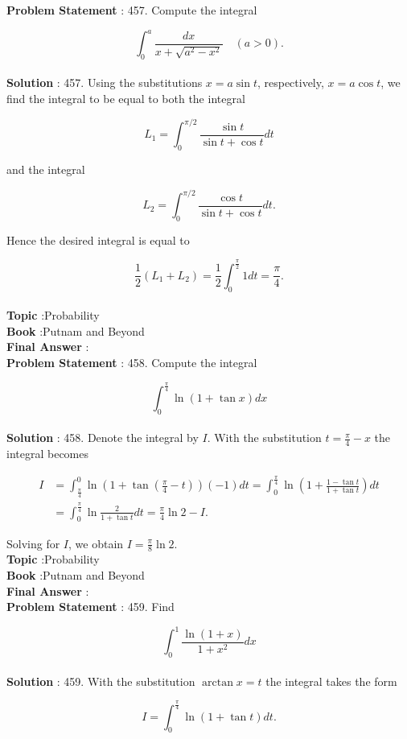 \documentclass[10pt]{article}
\begin{document}
\textbf{Problem Statement} :
457. Compute the integral

$$
\int_{0}^{a} \frac{d x}{x+\sqrt{a^{2}-x^{2}}} \quad(a>0) .
$$
\\
\textbf{Solution} :
457. Using the substitutions $x=a \sin t$, respectively, $x=a \cos t$, we find the integral to be equal to both the integral

$$
L_{1}=\int_{0}^{\pi / 2} \frac{\sin t}{\sin t+\cos t} d t
$$

and the integral

$$
L_{2}=\int_{0}^{\pi / 2} \frac{\cos t}{\sin t+\cos t} d t .
$$

Hence the desired integral is equal to

$$
\frac{1}{2}\left(L_{1}+L_{2}\right)=\frac{1}{2} \int_{0}^{\frac{\pi}{2}} 1 d t=\frac{\pi}{4} .
$$
\\
\textbf{Topic} :Probability\\
\textbf{Book} :Putnam and Beyond\\
\textbf{Final Answer} :\\


\textbf{Problem Statement} :
458. Compute the integral

$$
\int_{0}^{\frac{\pi}{4}} \ln (1+\tan x) d x
$$
\\
\textbf{Solution} :
458. Denote the integral by $I$. With the substitution $t=\frac{\pi}{4}-x$ the integral becomes

$$
\begin{aligned}
I &=\int_{\frac{\pi}{4}}^{0} \ln \left(1+\tan \left(\frac{\pi}{4}-t\right)\right)(-1) d t=\int_{0}^{\frac{\pi}{4}} \ln \left(1+\frac{1-\tan t}{1+\tan t}\right) d t \\
&=\int_{0}^{\frac{\pi}{4}} \ln \frac{2}{1+\tan t} d t=\frac{\pi}{4} \ln 2-I .
\end{aligned}
$$

Solving for $I$, we obtain $I=\frac{\pi}{8} \ln 2$.
\\
\textbf{Topic} :Probability\\
\textbf{Book} :Putnam and Beyond\\
\textbf{Final Answer} :\\


\textbf{Problem Statement} :
459. Find

$$
\int_{0}^{1} \frac{\ln (1+x)}{1+x^{2}} d x
$$
\\
\textbf{Solution} :
459. With the substitution $\arctan x=t$ the integral takes the form

$$
I=\int_{0}^{\frac{\pi}{4}} \ln (1+\tan t) d t .
$$
\end{document}

